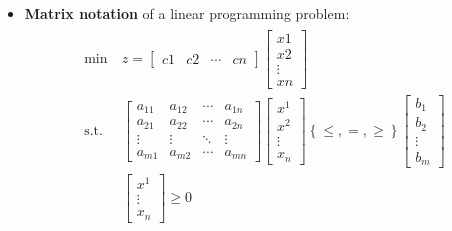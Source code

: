 \documentclass[english]{article}
\begin{document}
\begin{itemize}
  \item \textbf{Matrix notation} of a linear programming problem:
        \begin{gather*}
          \begin{aligned}
            \min \         & z = \begin{bmatrix}
                                   c1 & c2 & \cdots & cn
                                 \end{bmatrix}
            \begin{bmatrix}
              x1     \\
              x2     \\
              \vdots \\
              xn
            \end{bmatrix}                                              \\
            \text{s.t.} \  & \begin{bmatrix}
                               a_{11} & a_{12} & \cdots & a_{1n} \\
                               a_{21} & a_{22} & \cdots & a_{2n} \\
                               \vdots & \vdots & \ddots & \vdots \\
                               a_{m1} & a_{m2} & \cdots & a_{mn}
                             \end{bmatrix}
            \begin{bmatrix}
              x^1    \\
              x^2    \\
              \vdots \\
              x_n
            \end{bmatrix} \left\{ \leq, =, \geq \right\} \begin{bmatrix}
                                                           b_1    \\
                                                           b_2    \\
                                                           \vdots \\
                                                           b_m
                                                         \end{bmatrix} \\
                           & \begin{bmatrix}
                               x^1 \\ \vdots \\ x_n
                             \end{bmatrix}
            \geq 0
          \end{aligned}
        \end{gather*}
\end{itemize}
\end{document}
